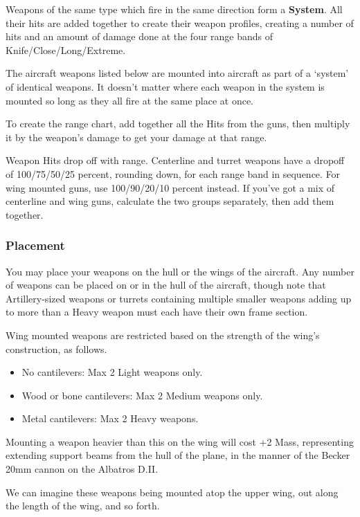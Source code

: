 \documentclass{article}
\begin{document}
Weapons of the same type which fire in the same direction form a
\textbf{System}. All their hits are added together to create their
weapon profiles, creating a number of hits and an amount of damage done
at the four range bands of Knife/Close/Long/Extreme.

The aircraft weapons listed below are mounted into aircraft as part of a
`system' of identical weapons. It doesn't matter where each weapon in
the system is mounted so long as they all fire at the same place at
once.

To create the range chart, add together all the Hits from the guns, then
multiply it by the weapon's damage to get your damage at that range.

Weapon Hits drop off with range. Centerline and turret weapons have a
dropoff of 100/75/50/25 percent, rounding down, for each range band in
sequence. For wing mounted guns, use 100/90/20/10 percent instead. If
you've got a mix of centerline and wing guns, calculate the two groups
separately, then add them together.

\subsubsection{Placement}
\label{_Placement}

You may place your weapons on the hull or the wings of the aircraft. Any
number of weapons can be placed on or in the hull of the aircraft,
though note that Artillery-sized weapons or turrets containing multiple
smaller weapons adding up to more than a Heavy weapon must each have
their own frame section.

Wing mounted weapons are restricted based on the strength of the wing's
construction, as follows.

\begin{itemize}
  \item          No cantilevers: Max 2 Light weapons only.
  \item          Wood or bone cantilevers: Max 2 Medium weapons only.
  \item          Metal cantilevers: Max 2 Heavy weapons.
\end{itemize}

Mounting a weapon heavier than this on the wing will cost +2 Mass,
representing extending support beams from the hull of the plane, in the
manner of the Becker 20mm cannon on the Albatros D.II.

We can imagine these weapons being mounted atop the upper wing, out
along the length of the wing, and so forth.
\end{document}
